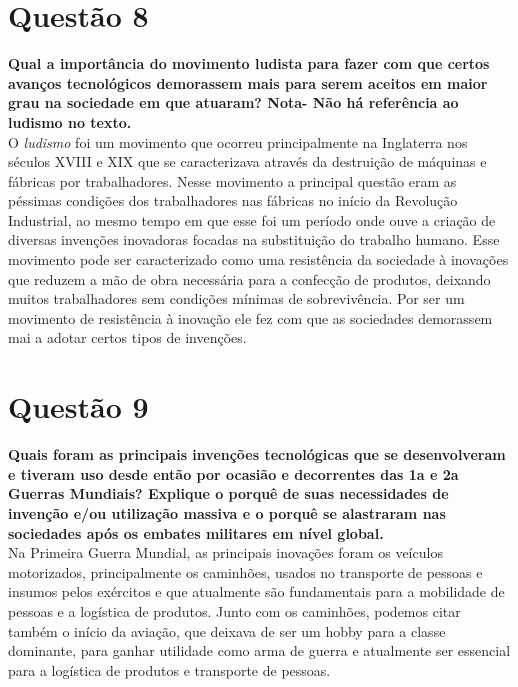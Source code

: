 
\section{Questão 8}
\label{sec:q8}
\textbf{Qual a importância do movimento ludista para fazer com que certos avanços tecnológicos demorassem mais para serem aceitos em maior grau na sociedade em que atuaram? Nota- Não há referência ao ludismo no texto.} \\

O \textit{ludismo} foi um movimento que ocorreu principalmente na Inglaterra nos séculos XVIII e XIX que se caracterizava através da destruição de máquinas e fábricas por trabalhadores. Nesse movimento a principal questão eram as péssimas condições dos trabalhadores nas fábricas no início da Revolução Industrial, ao mesmo tempo em que esse foi um período onde ouve a criação de diversas invenções inovadoras focadas na substituição do trabalho humano. Esse movimento pode ser caracterizado como uma resistência da sociedade à inovações que reduzem a mão de obra necessária para a confecção de produtos, deixando muitos trabalhadores sem condições mínimas de sobrevivência. Por ser um movimento de resistência à inovação ele fez com que as sociedades demorassem mai a adotar certos tipos de invenções.


\section{Questão 9}
\label{sec:q9}
\textbf{Quais foram as principais invenções tecnológicas que se desenvolveram e tiveram uso desde então por ocasião e decorrentes das 1a e 2a Guerras Mundiais? Explique o porquê de suas necessidades de invenção e/ou utilização massiva e o porquê se alastraram nas sociedades após os embates militares em nível global.} \\

Na Primeira Guerra Mundial, as principais inovações foram os veículos motorizados, principalmente os caminhões, usados no transporte de pessoas e insumos pelos exércitos e que atualmente são fundamentais para a mobilidade de pessoas e a logística de produtos. Junto com os caminhões, podemos citar também o início da aviação, que deixava de ser um hobby para a classe dominante, para ganhar utilidade como arma de guerra e atualmente ser essencial para a logística de produtos e transporte de pessoas.

